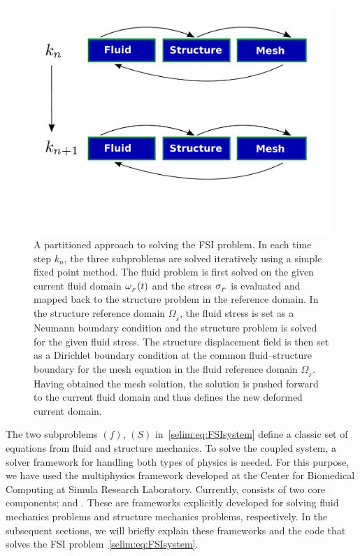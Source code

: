 \begin{figure}
  \centering
  \includegraphics[width=\largefig]{chapters/selim/pdf/primal.pdf}
  \caption{A partitioned approach to solving the FSI problem. In each
    time step $k_n$, the three subproblems are solved iteratively
    using a simple fixed point method. The fluid problem is first
    solved on the given current fluid domain $\omega_{_{F}}(t)$ and the stress
    $\sigma_{_{F}}$ is evaluated and mapped back to the
    structure problem in the reference domain. In the structure
    reference domain $\Omega_{_{S}}$, the fluid stress is set as a
    Neumann boundary condition and the structure problem is solved for the
    given fluid stress. The structure displacement field is then set
    as a Dirichlet boundary condition at the common fluid--structure
    boundary for the mesh equation in the fluid reference domain
    $\Omega_{_{F}}$. Having obtained the mesh solution, the solution
    is pushed forward to the current fluid domain and thus defines the
    new deformed current domain.}
  \label{selim:fig:fp}
\end{figure}

The two subproblems $(f)$, $(S)$ in~\eqref{selim:eq:FSIsystem} define a
classic set of equations from fluid and structure mechanics. To solve the
coupled system, a solver framework for handling both types of physics
is needed. For this purpose, we have used the multiphysics framework
 developed at the Center for Biomedical Computing at
Simula Research Laboratory. Currently,  consists of
two core components;  and .  These are
frameworks explicitly developed for solving fluid mechanics problems and
structure mechanics problems, respectively.  In the subsequent sections,
we will briefly explain these frameworks and the code that solves the
FSI problem~\eqref{selim:eq:FSIsystem}.

